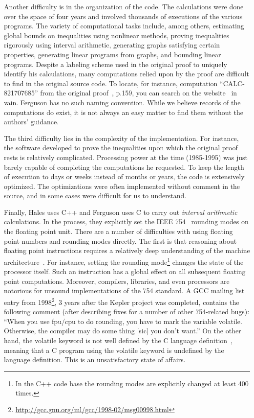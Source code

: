 \documentclass[11pt]{amsart}
\begin{document}
Another difficulty is in the organization of the code. The
calculations were done over the space of four years and involved %
thousands of executions of the various programs. The variety of
computational tasks include, among others, estimating global bounds on
inequalities using nonlinear methods, proving inequalities rigorously
using interval arithmetic, generating graphs satisfying certain
properties, generating linear programs from graphs, and bounding
linear programs. Despite a labeling scheme used in the original proof 
to uniquely
identify his calculations, many computations relied upon by the proof
are difficult to find in the original source code. To locate, for
instance, computation ``CALC-821707685'' from the original proof~\cite{Hales:2006:DCG},
p.159, you can search on the website~\cite{website:Hales:1998:Code} in
vain. Ferguson has no such naming convention. While we believe records
of the computations do exist, it is not always an easy matter
to find them without the authors' guidance.

The third difficulty lies in the complexity of the implementation. For instance,
the software  developed to prove the inequalities upon which the original
proof rests is relatively complicated. Processing power at the time
(1985-1995) was just barely capable of completing the computations he
requested. To keep the length of execution to days or weeks instead of
months or years, the code is extensively optimized. The
optimizations were often implemented without comment in the source,
and in some cases were difficult for us to understand.  

Finally, Hales uses C++ and Ferguson uses C to carry out
\emph{interval arithmetic} calculations. In the process, they
explicitly set the IEEE 754~\cite{IEEE:1985:IEE754} rounding modes on
the floating point unit. There are a number of difficulties with using
floating point numbers and rounding modes directly. The first is that
reasoning about floating point instructions requires a relatively deep
understanding of the machine architecture~\cite{Monniaux:2008:TOPLAS}.
For instance, setting the rounding mode\footnote{In the C++ code
base the rounding modes are explicitly changed at least 400 times.}
changes the state of the processor itself. Such an instruction has a
global effect on all subsequent floating point computations. Moreover,
compilers, libraries, and even processors are notorious for unsound
implementations of the 754 standard. A GCC mailing list entry from
1998\footnote{\url{http://gcc.gnu.org/ml/gcc/1998-02/msg00998.html}},
3 years after the Kepler project was completed, contains the following
comment (after describing fixes for a number of other 754-related
bugs): ``When you use fpu/cpu to do rounding, you have to mark the
variable volatile. Otherwise, the compiler may do some thing [sic] you don't
want.'' On the other hand, the volatile keyword is not well defined by
the C language definition~\cite{Kernighan:1988:C}, meaning that a C
program using the volatile keyword is undefined by the
language definition. This is an unsatisfactory state of affairs.
\end{document}

